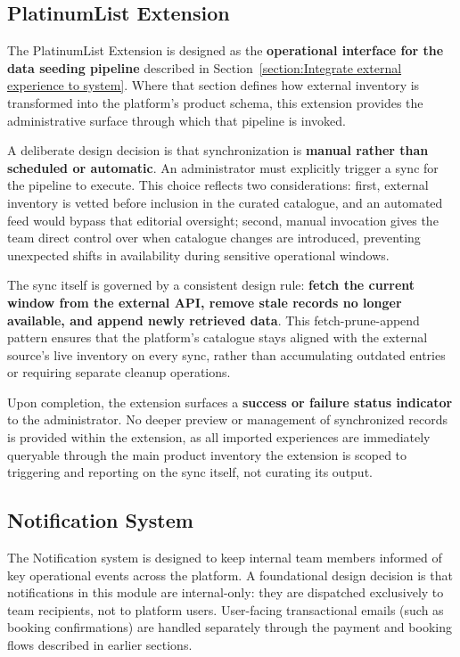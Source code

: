 \subsection{PlatinumList Extension}
\label{subsection:PlatinumList Extension}
The PlatinumList Extension is designed as the \textbf{operational interface for the data seeding pipeline} described in Section~\ref{section:Integrate external experience to system}. Where that section defines how external inventory is transformed into the platform's product schema, this extension provides the administrative surface through which that pipeline is invoked.

A deliberate design decision is that synchronization is \textbf{manual rather than scheduled or automatic}. An administrator must explicitly trigger a sync for the pipeline to execute. This choice reflects two considerations: first, external inventory is vetted before inclusion in the curated catalogue, and an automated feed would bypass that editorial oversight; second, manual invocation gives the team direct control over when catalogue changes are introduced, preventing unexpected shifts in availability during sensitive operational windows.

The sync itself is governed by a consistent design rule: \textbf{fetch the current window from the external API, remove stale records no longer available, and append newly retrieved data}. This fetch-prune-append pattern ensures that the platform's catalogue stays aligned with the external source's live inventory on every sync, rather than accumulating outdated entries or requiring separate cleanup operations.

Upon completion, the extension surfaces a \textbf{success or failure status indicator} to the administrator. No deeper preview or management of synchronized records is provided within the extension, as all imported experiences are immediately queryable through the main product inventory the extension is scoped to triggering and reporting on the sync itself, not curating its output.

\subsection{Notification System}
The Notification system is designed to keep internal team members informed of key operational events across the platform. A foundational design decision is that notifications in this module are internal-only: they are dispatched exclusively to team recipients, not to platform users. User-facing transactional emails (such as booking confirmations) are handled separately through the payment and booking flows described in earlier sections.

